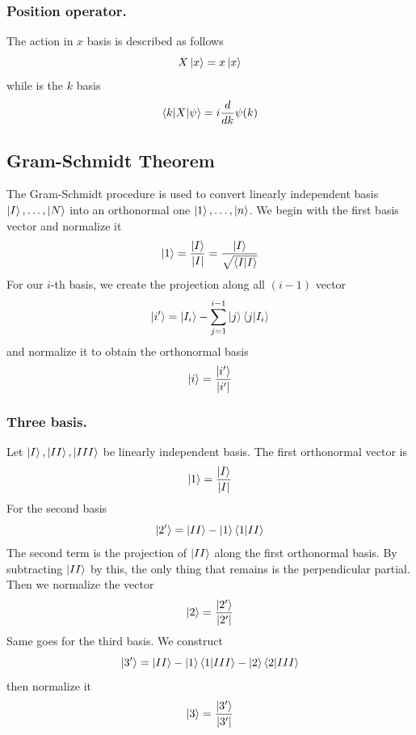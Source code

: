 \documentclass[../../../main.tex]{subfiles}
\begin{document}
\subsubsection{Position operator.}
The action in $x$ basis is described as follows
\begin{equation*}
	X \ket{x}=x \ket{x}
\end{equation*}
while is the $k$ basis
\begin{equation*}
	\braket{k|X|\psi}=i \frac{d }{dk}\psi(k)
\end{equation*}

\subsection{Gram-Schmidt Theorem}
The Gram-Schmidt procedure is used to convert linearly independent basis $\ket{I},\dots,\ket{N}$ into an orthonormal one $\ket{1},\dots,\ket{n}$.
We begin with the first basis vector and normalize it
\begin{equation*}
	\ket{1}=\frac{\ket{I}}{|I|}=\frac{\ket{I}}{\sqrt{\braket{I|I}}}
\end{equation*}
For our $i$-th basis, we create the projection along all $(i-1)$ vector
\begin{equation*}
	\ket{i'}=\ket{I_i}-\sum_{j=1}^{i-1}\ket{j}\braket{j|I_i}
\end{equation*}
and normalize it to obtain the orthonormal basis
\begin{equation*}
	\ket{i}=\frac{\ket{i'}}{|i'|}
\end{equation*}

\subsubsection{Three basis.}
Let $\ket{I}, \ket{II}, \ket{III}$ be linearly independent basis.
The first orthonormal vector is
\begin{equation*}
	\ket{1}=\frac{\ket{I}}{|I|}
\end{equation*}
For the second basis
\begin{equation*}
	\ket{2'}=\ket{II}-\ket{1}\braket{1|II}
\end{equation*}
The second term is the projection of $\ket{II}$ along the first orthonormal basis.
By subtracting $\ket{II}$ by this, the only thing that remains is the perpendicular partial.
Then we normalize the vector
\begin{equation*}
	\ket{2}=\frac{\ket{2'}}{|2'|}
\end{equation*}
Same goes for the third basis.
We construct
\begin{equation*}
	\ket{3'} =\ket{II}-\ket{1}\braket{1|III}-\ket{2}\braket{2|III}
\end{equation*}
then normalize it
\begin{equation*}
	\ket{3}=\frac{\ket{3'}}{|3'|}
\end{equation*}
\end{document}
